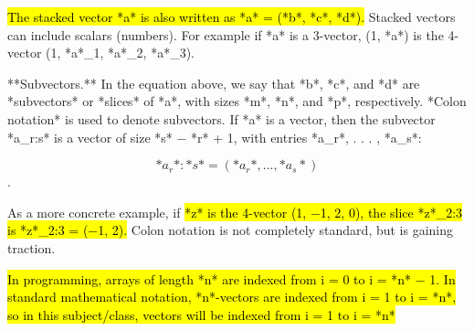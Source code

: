 \documentclass{article}
\begin{document}
\hl{The stacked vector *a* is also written as *a* = (*b*, *c*, *d*).}
Stacked vectors can include scalars (numbers). For example if *a* is a 3-vector,
(1, *a*) is the 4-vector (1, *a*_1, *a*_2, *a*_3).

**Subvectors.** In the equation above, we say that *b*, *c*, and *d* are *subvectors* or *slices* of *a*, with sizes *m*, *n*, and *p*, respectively. *Colon notation* is used to denote subvectors. If *a* is a vector, then the subvector *a_r:s* is a vector of size *s* − *r* + 1, with entries *a_r*, . . . , *a_s*:

\newline 
\newline 
\begin{equation*}
	*a_r*:*s* = (*a_r*, . . . , *a_s*)
\end{equation*}.

As a more concrete example, if \hl{*z* is the 4-vector (1, −1, 2, 0), the slice *z*_2:3 is *z*_2:3 = (−1, 2).} Colon notation is not completely standard, but is gaining traction.

\hl{In programming, arrays of length *n* are indexed from i = 0 to i = *n* − 1. In standard mathematical notation, *n*-vectors are indexed from i = 1 to i = *n*, so in this subject/class, vectors will be indexed from i = 1 to i = *n*}
\end{document}
